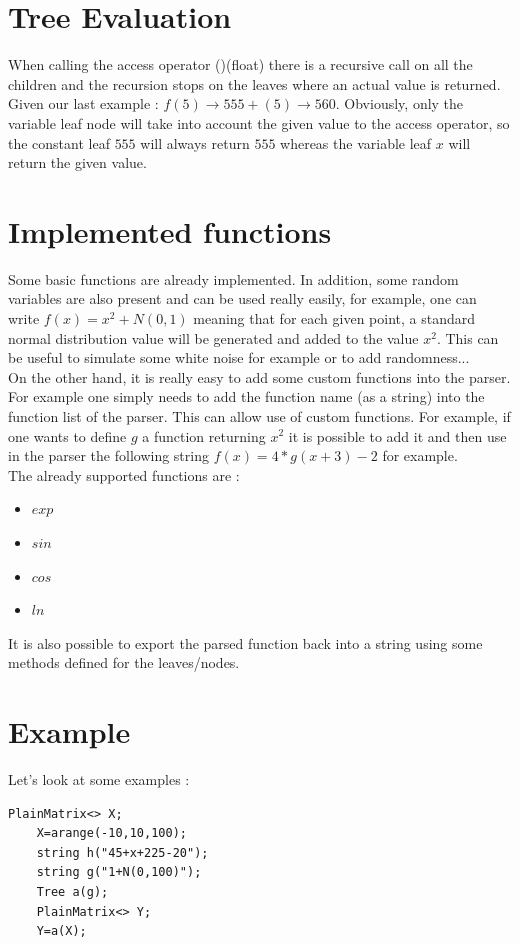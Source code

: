 \documentclass[a4paper]{report}
\begin{document}
\section{Tree Evaluation}
When calling the access operator ()(float) there is a recursive call on all the children and the recursion stops on the leaves where an actual value is returned. Given our last example : $f(5) \rightarrow 555+(5)\rightarrow 560$. Obviously, only the variable leaf node will take into account the given value to the access operator, so the constant leaf $555$ will always return $555$ whereas the variable leaf $x$ will return the given value. 

\section{Implemented functions}
Some basic functions are already implemented. In addition, some random variables are also present and can be used really easily, for example, one can write $f(x)=x^2+N(0,1)$ meaning that for each given point, a standard normal distribution value will be generated and added to the value $x^2$. This can be useful to simulate some white noise for example or to add randomness...
\\
On the other hand, it is really easy to add some custom functions into the parser. For example one simply needs to add the function name (as a string) into the function list of the parser. This can allow use of custom functions. For example, if one wants to define $g$ a function returning $x^2$ it is possible to add it and then use in the parser the following string $f(x)=4*g(x+3)-2$ for example.\\
The already supported functions are :
\begin{itemize}
\item $exp$
\item $sin$
\item $cos$
\item $ln$
\end{itemize}

It is also possible to export the parsed function back into a string using some methods defined for the leaves/nodes. 
\section{Example}
Let's look at some examples :
\begin{lstlisting}[basicstyle=\tiny]
    PlainMatrix<> X;
    X=arange(-10,10,100);
    string h("45+x+225-20");
    string g("1+N(0,100)");
    Tree a(g);
    PlainMatrix<> Y;
    Y=a(X);
\end{lstlisting}
\end{document}
